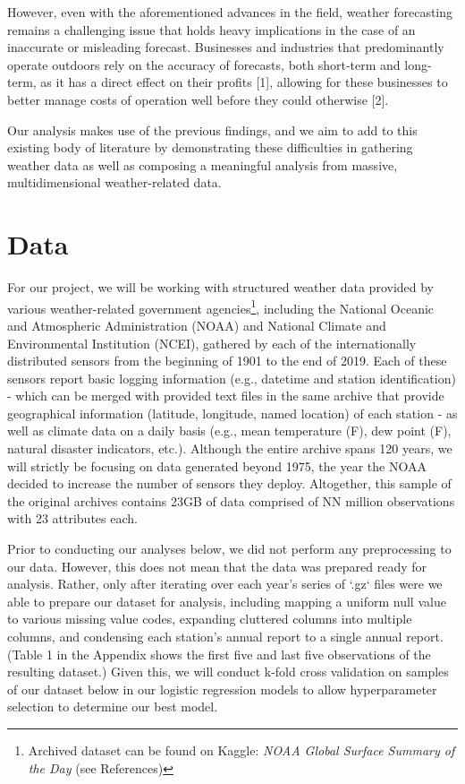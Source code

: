 \documentclass[conference]{IEEEtran}
\begin{document}
However, even with the aforementioned advances in the field, weather forecasting remains a challenging issue that holds heavy implications in the case of an inaccurate or misleading forecast. Businesses and industries that predominantly operate outdoors rely on the accuracy of forecasts, both short-term and long-term, as it has a direct effect on their profits [1], allowing for these businesses to better manage costs of operation well before they could otherwise [2].

Our analysis makes use of the previous findings, and we aim to add to this existing body of literature by demonstrating these difficulties in gathering weather data as well as composing a meaningful analysis from massive, multidimensional weather-related data.

\section{Data}

For our project, we will be working with structured weather data provided by various weather-related government agencies\footnote{Archived dataset can be found on Kaggle: \textit{NOAA Global Surface Summary of the Day} (see References)}, including the National Oceanic and Atmospheric Administration (NOAA) and National Climate and Environmental Institution (NCEI), gathered by each of the internationally distributed sensors from the beginning of 1901 to the end of 2019. Each of these sensors report basic logging information (e.g., datetime and station identification) - which can be merged with provided text files in the same archive that provide geographical information (latitude, longitude, named location) of each station - as well as climate data on a daily basis (e.g., mean temperature (F), dew point (F), natural disaster indicators, etc.). Although the entire archive spans 120 years, we will strictly be focusing on data generated beyond 1975, the year the NOAA decided to increase the number of sensors they deploy. Altogether, this sample of the original archives contains 23GB of data comprised of NN million observations with 23 attributes each.

Prior to conducting our analyses below, we did not perform any preprocessing to our data. However, this does not mean that the data was prepared ready for analysis. Rather, only after iterating over each year's series of `.gz` files were we able to prepare our dataset for analysis, including mapping a uniform null value to various missing value codes, expanding cluttered columns into multiple columns, and condensing each station's annual report to a single annual report. (Table 1 in the Appendix shows the first five and last five observations of the resulting dataset.) Given this, we will conduct k-fold cross validation on samples of our dataset below in our logistic regression models to allow hyperparameter selection to determine our best model.
\end{document}
